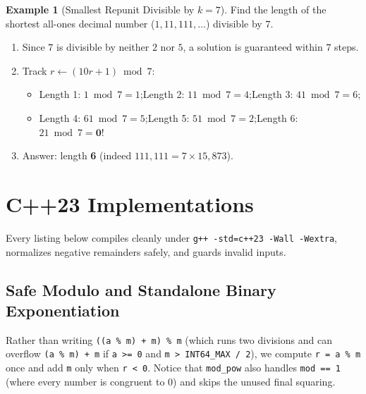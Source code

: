 \documentclass[11pt,a4paper]{article}
\theoremstyle{definition}
\newtheorem{example}{Example}[section]
\begin{document}
\begin{example}[Smallest Repunit Divisible by $k = 7$]
Find the length of the shortest all-ones decimal number ($1, 11, 111, \dots$) divisible by $7$.
\begin{enumerate}
    \item Since $7$ is divisible by neither $2$ nor $5$, a solution is guaranteed within $7$ steps.
    \item Track $r \leftarrow (10r + 1) \bmod 7$:
    \begin{itemize}
        \item Length 1: $1 \bmod 7 = 1$;\quad Length 2: $11 \bmod 7 = 4$;\quad Length 3: $41 \bmod 7 = 6$;
        \item Length 4: $61 \bmod 7 = 5$;\quad Length 5: $51 \bmod 7 = 2$;\quad Length 6: $21 \bmod 7 = \mathbf{0}$!
    \end{itemize}
    \item Answer: length \textbf{6} (indeed $111{,}111 = 7 \times 15{,}873$).
\end{enumerate}
\end{example}

\section{C++23 Implementations}

Every listing below compiles cleanly under \texttt{g++ -std=c++23 -Wall -Wextra}, normalizes negative remainders safely, and guards invalid inputs.

\subsection{Safe Modulo and Standalone Binary Exponentiation}

Rather than writing \texttt{((a \% m) + m) \% m} (which runs two divisions and can overflow \texttt{(a \% m) + m} if \texttt{a >= 0} and \texttt{m > INT64\_MAX / 2}), we compute \texttt{r = a \% m} once and add \texttt{m} only when \texttt{r < 0}. Notice that \texttt{mod\_pow} also handles \texttt{mod == 1} (where every number is congruent to $0$) and skips the unused final squaring.
\end{document}

